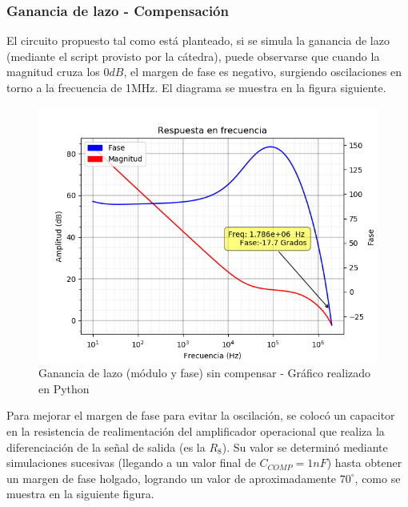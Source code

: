 \subsubsection{Ganancia de lazo - Compensación}

El circuito propuesto tal como está planteado, si se simula la ganancia de lazo (mediante el script provisto por la cátedra), puede observarse que cuando la magnitud cruza los $0dB$, el margen de fase es negativo, surgiendo oscilaciones en torno a la frecuencia de 1MHz. El diagrama se muestra en la figura siguiente.

\begin{figure}[!ht]
\begin{centering}
\includegraphics[scale=0.6]{Imagenes/LazoSinCompenzar.png}
\par\end{centering}
\caption{Ganancia de lazo (módulo y fase) sin compensar - Gráfico realizado en Python}
\end{figure}

Para mejorar el margen de fase para evitar la oscilación, se colocó un capacitor en la resistencia de realimentación del amplificador operacional que realiza la diferenciación de la señal de salida (es la $R_8$). Su valor se determinó mediante simulaciones sucesivas (llegando a un valor final de $C_{COMP} = 1nF$) hasta obtener un margen de fase holgado, logrando un valor de aproximadamente $70^{\circ}$, como se muestra en la siguiente figura.

